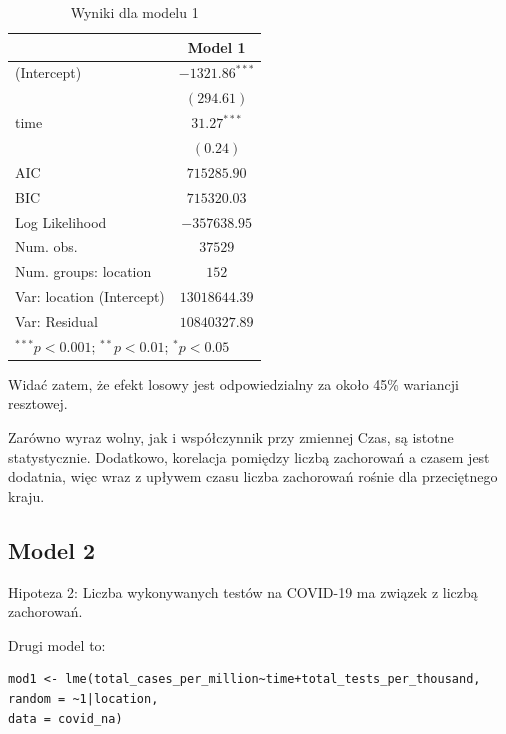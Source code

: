 \documentclass[12pt]{mwbk}
\theoremstyle{plain}
\theoremstyle{definition}
\theoremstyle{remark}
\begin{document}
\begin{table}[!htbp]
	\begin{center}
		\begin{tabular}{l c}
			\hline
			& Model 1 \\
			\hline
			(Intercept)               & $-1321.86^{***}$ \\
			& $(294.61)$       \\
			time                      & $31.27^{***}$    \\
			& $(0.24)$         \\
			\hline
			AIC                       & $715285.90$      \\
			BIC                       & $715320.03$      \\
			Log Likelihood            & $-357638.95$     \\
			Num. obs.                 & $37529$          \\
			Num. groups: location     & $152$            \\
			Var: location (Intercept) & $13018644.39$    \\
			Var: Residual             & $10840327.89$    \\
			\hline
			\multicolumn{2}{l}{\scriptsize{$^{***}p<0.001$; $^{**}p<0.01$; $^{*}p<0.05$}}
		\end{tabular}
		\caption{Wyniki dla modelu 1}
		\label{table:model1}
	\end{center}
\end{table}



Widać zatem, że efekt losowy jest odpowiedzialny za około 45\% wariancji resztowej.



Zarówno wyraz wolny, jak i współczynnik przy zmiennej Czas, są istotne statystycznie. Dodatkowo, korelacja pomiędzy liczbą zachorowań a czasem jest dodatnia, więc wraz z upływem czasu liczba zachorowań rośnie dla przeciętnego kraju.
\subsection{Model 2}

Hipoteza 2: Liczba wykonywanych testów na COVID-19 ma związek z liczbą zachorowań.

Drugi model to:
\begin{verbatim}
mod1 <- lme(total_cases_per_million~time+total_tests_per_thousand,
random = ~1|location,
data = covid_na)
\end{verbatim}
\end{document}

